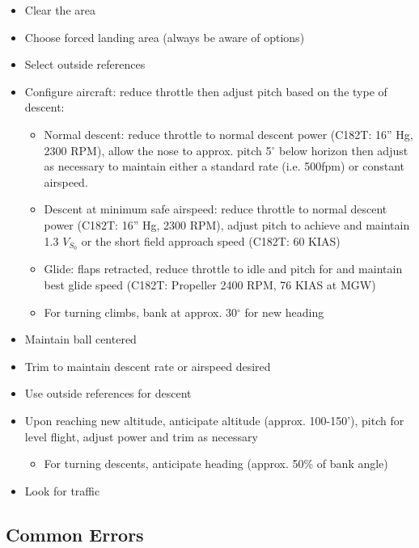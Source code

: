 \begin{itemize}
  \item Clear the area
  \item Choose forced landing area (always be aware of options) 
  \item Select outside references
  \item Configure aircraft: reduce throttle then adjust pitch based on the type
    of descent:
    \begin{itemize}
      \item Normal descent: reduce throttle to normal descent power (C182T:
        16'' Hg, 2300 RPM), allow the nose to approx. pitch 5$^\circ$ below
        horizon then adjust as necessary to maintain either a standard rate
        (i.e.  500fpm) or constant airspeed.
      \item Descent at minimum safe airspeed: reduce throttle to normal descent
        power (C182T: 16'' Hg, 2300 RPM), adjust pitch to achieve and maintain
        1.3 $V_{S_0}$ or the short field approach speed (C182T: 60 KIAS)
      \item Glide: flaps retracted, reduce throttle to idle and pitch for and
        maintain best glide speed (C182T: Propeller 2400 RPM, 76 KIAS at MGW)
      \item For turning climbs, bank at approx. 30$^\circ$ for new heading
    \end{itemize}
  \item Maintain ball centered
  \item Trim to maintain descent rate or airspeed desired
  \item Use outside references for descent
  \item Upon reaching new altitude, anticipate altitude (approx. 100-150'),
    pitch for level flight, adjust power and trim as necessary
    \begin{itemize}
      \item For turning descents, anticipate heading (approx. 50\% of bank
        angle)
    \end{itemize}
  \item Look for traffic
\end{itemize}

\subsection{Common Errors}

